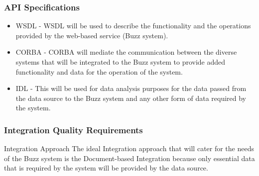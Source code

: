 \subsubsection{API Specifications}
\begin{itemize}
\item WSDL - WSDL will be used to describe the functionality and the operations provided by the web-based service (Buzz system).
\item CORBA - CORBA will mediate the communication between the diverse systems that will be integrated to the Buzz system to provide added functionality and data for the operation of the system.
\item IDL - This will be used for data analysis purposes for the data passed from the data source to the Buzz system and any other form of data required by the system.
\end{itemize}

\subsubsection{Integration Quality Requirements}


Integration Approach
The ideal Integration approach that will cater for the needs of the Buzz system is the Document-based Integration because only essential data that is required by the system will be provided by the data source.

